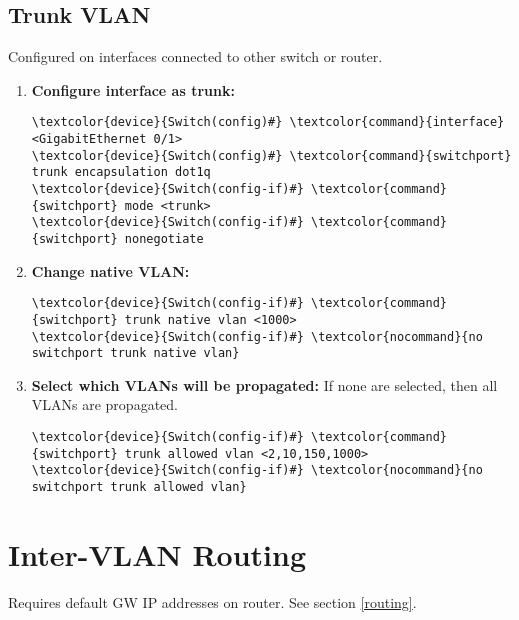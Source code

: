 \documentclass[10pt, a4paper, onecolumn, oneside, titlepage, openany]{book}
\begin{document}
\subsection{Trunk VLAN}
Configured on interfaces connected to other switch or router.
\begin{enumerate}
    \item \textbf{Configure interface as trunk:}
\begin{Verbatim}[commandchars=\\\{\}]
\textcolor{device}{Switch(config)#} \textcolor{command}{interface} <GigabitEthernet 0/1>
\textcolor{device}{Switch(config)#} \textcolor{command}{switchport} trunk encapsulation dot1q
\textcolor{device}{Switch(config-if)#} \textcolor{command}{switchport} mode <trunk>
\textcolor{device}{Switch(config-if)#} \textcolor{command}{switchport} nonegotiate
\end{Verbatim}
    \item \textbf{Change native VLAN:}
\begin{Verbatim}[commandchars=\\\{\}]
\textcolor{device}{Switch(config-if)#} \textcolor{command}{switchport} trunk native vlan <1000>
\textcolor{device}{Switch(config-if)#} \textcolor{nocommand}{no switchport trunk native vlan}
\end{Verbatim}
    \item \textbf{Select which VLANs will be propagated:}
\newline If none are selected, then all VLANs are propagated.
\begin{Verbatim}[commandchars=\\\{\}]
\textcolor{device}{Switch(config-if)#} \textcolor{command}{switchport} trunk allowed vlan <2,10,150,1000>
\textcolor{device}{Switch(config-if)#} \textcolor{nocommand}{no switchport trunk allowed vlan}
\end{Verbatim}
\end{enumerate}

\section{Inter-VLAN Routing}
Requires default GW IP addresses on router. See section \ref{routing}.
\end{document}
